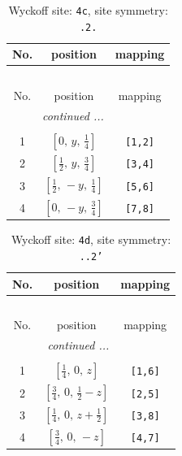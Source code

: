 \documentclass[fleqn,8pt]{jsarticle}
\begin{document}
\renewcommand{\arraystretch}{1.2}
\begin{longtable}{ccc}
\caption{Wyckoff site: {\tt 4c}, site symmetry: {\tt .2.}}
 \\
 \hline \hline
No. & position & mapping \\ \hline \endfirsthead

\multicolumn{2}{l}{\tablename\ \thetable{}} \\
 \hline \hline
No. & position & mapping \\ \hline \endhead

 \hline \hline
\multicolumn{2}{r}{\footnotesize\it continued ...} \\ \endfoot

 \hline \hline
\multicolumn{2}{r}{} \\ \endlastfoot

1 & $\left[ 0,\, y,\, \frac{1}{4} \right]$ & {\tt [1,2]} \\ \hline
2 & $\left[ \frac{1}{2},\, y,\, \frac{3}{4} \right]$ & {\tt [3,4]} \\ \hline
3 & $\left[ \frac{1}{2},\, - y,\, \frac{1}{4} \right]$ & {\tt [5,6]} \\ \hline
4 & $\left[ 0,\, - y,\, \frac{3}{4} \right]$ & {\tt [7,8]} \\
\end{longtable}
\renewcommand{\arraystretch}{1.2}
\begin{longtable}{ccc}
\caption{Wyckoff site: {\tt 4d}, site symmetry: {\tt ..2'}}
 \\
 \hline \hline
No. & position & mapping \\ \hline \endfirsthead

\multicolumn{2}{l}{\tablename\ \thetable{}} \\
 \hline \hline
No. & position & mapping \\ \hline \endhead

 \hline \hline
\multicolumn{2}{r}{\footnotesize\it continued ...} \\ \endfoot

 \hline \hline
\multicolumn{2}{r}{} \\ \endlastfoot

1 & $\left[ \frac{1}{4},\, 0,\, z \right]$ & {\tt [1,6]} \\ \hline
2 & $\left[ \frac{3}{4},\, 0,\, \frac{1}{2} - z \right]$ & {\tt [2,5]} \\ \hline
3 & $\left[ \frac{1}{4},\, 0,\, z + \frac{1}{2} \right]$ & {\tt [3,8]} \\ \hline
4 & $\left[ \frac{3}{4},\, 0,\, - z \right]$ & {\tt [4,7]} \\
\end{longtable}
\end{document}
